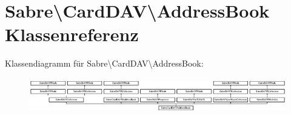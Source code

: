 \hypertarget{class_sabre_1_1_card_d_a_v_1_1_address_book}{}\section{Sabre\textbackslash{}Card\+D\+AV\textbackslash{}Address\+Book Klassenreferenz}
\label{class_sabre_1_1_card_d_a_v_1_1_address_book}
Klassendiagramm für Sabre\textbackslash{}Card\+D\+AV\textbackslash{}Address\+Book\+:\begin{figure}[H]
\begin{center}
\leavevmode
\includegraphics[height=1.523810cm]{class_sabre_1_1_card_d_a_v_1_1_address_book}
\end{center}
\end{figure}
